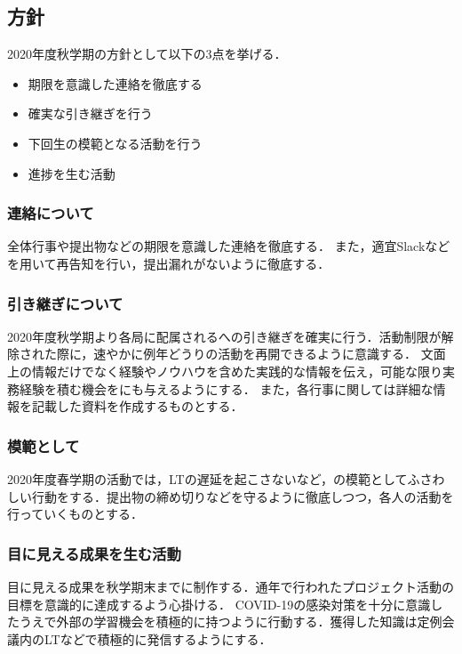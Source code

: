 \subsection*{\secondGrade{}方針}


2020年度秋学期の\secondGrade{}方針として以下の3点を挙げる．

\begin{itemize}
    \item 期限を意識した連絡を徹底する
    \item 確実な引き継ぎを行う
    \item 下回生の模範となる活動を行う
    \item 進捗を生む活動
\end{itemize}

\subsubsection*{連絡について}
全体行事や提出物などの期限を意識した連絡を徹底する．
また，適宜Slackなどを用いて再告知を行い，提出漏れがないように徹底する．

\subsubsection*{引き継ぎについて}
2020年度秋学期より各局に配属される\firstGrade{}への引き継ぎを確実に行う．活動制限が解除された際に，速やかに例年どうりの活動を再開できるように意識する．
文面上の情報だけでなく経験やノウハウを含めた実践的な情報を伝え，可能な限り実務経験を積む機会を\firstGrade{}にも与えるようにする．
また，各行事に関しては詳細な情報を記載した資料を作成するものとする．

\subsubsection*{模範として}
2020年度春学期の活動では，LTの遅延を起こさないなど，\firstGrade{}の模範としてふさわしい行動をする．提出物の締め切りなどを守るように徹底しつつ，各人の活動を行っていくものとする．

\subsubsection*{目に見える成果を生む活動}
目に見える成果を秋学期末までに制作する．通年で行われたプロジェクト活動の目標を意識的に達成するよう心掛ける．
COVID-19の感染対策を十分に意識したうえで外部の学習機会を積極的に持つように行動する．獲得した知識は定例会議内のLTなどで積極的に発信するようにする．

